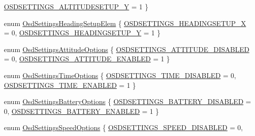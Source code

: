 \begin{DoxyCompactItemize}
\hyperlink{group___osd_settings_gga18264390d2835507563456b24f1dcb60a592bcfde58f9c3cf02070e2d4d96c140}{\-O\-S\-D\-S\-E\-T\-T\-I\-N\-G\-S\-\_\-\-A\-L\-T\-I\-T\-U\-D\-E\-S\-E\-T\-U\-P\-\_\-\-Y} = 1
 \}
\item 
enum \hyperlink{group___osd_settings_ga18a158ec456312dd7aeb13fa9e99f380}{\-Osd\-Settings\-Heading\-Setup\-Elem} \{ \hyperlink{group___osd_settings_gga18a158ec456312dd7aeb13fa9e99f380a3e342c17a72e8f2f9ce5863602b6ba02}{\-O\-S\-D\-S\-E\-T\-T\-I\-N\-G\-S\-\_\-\-H\-E\-A\-D\-I\-N\-G\-S\-E\-T\-U\-P\-\_\-\-X} = 0, 
\hyperlink{group___osd_settings_gga18a158ec456312dd7aeb13fa9e99f380a8a14958b0b8a7a6ec356d9b7a7de1b49}{\-O\-S\-D\-S\-E\-T\-T\-I\-N\-G\-S\-\_\-\-H\-E\-A\-D\-I\-N\-G\-S\-E\-T\-U\-P\-\_\-\-Y} = 1
 \}
\item 
enum \hyperlink{group___osd_settings_gaacff9da7fadd73b3f77732789fc3b015}{\-Osd\-Settings\-Attitude\-Options} \{ \hyperlink{group___osd_settings_ggaacff9da7fadd73b3f77732789fc3b015a8c47c1d9752a75c1268c9d44c0284221}{\-O\-S\-D\-S\-E\-T\-T\-I\-N\-G\-S\-\_\-\-A\-T\-T\-I\-T\-U\-D\-E\-\_\-\-D\-I\-S\-A\-B\-L\-E\-D} = 0, 
\hyperlink{group___osd_settings_ggaacff9da7fadd73b3f77732789fc3b015a9d40e6702b19dc2f4a49c4ee9d3ef2be}{\-O\-S\-D\-S\-E\-T\-T\-I\-N\-G\-S\-\_\-\-A\-T\-T\-I\-T\-U\-D\-E\-\_\-\-E\-N\-A\-B\-L\-E\-D} = 1
 \}
\item 
enum \hyperlink{group___osd_settings_gafe2af3db28b01633d6435ea50b6f9092}{\-Osd\-Settings\-Time\-Options} \{ \hyperlink{group___osd_settings_ggafe2af3db28b01633d6435ea50b6f9092a4de2e3f162202a18d5aa5bf9bfb35314}{\-O\-S\-D\-S\-E\-T\-T\-I\-N\-G\-S\-\_\-\-T\-I\-M\-E\-\_\-\-D\-I\-S\-A\-B\-L\-E\-D} = 0, 
\hyperlink{group___osd_settings_ggafe2af3db28b01633d6435ea50b6f9092af7c374d8c3479a2ee8c8f305800275f3}{\-O\-S\-D\-S\-E\-T\-T\-I\-N\-G\-S\-\_\-\-T\-I\-M\-E\-\_\-\-E\-N\-A\-B\-L\-E\-D} = 1
 \}
\item 
enum \hyperlink{group___osd_settings_gaa88f3eee2171bf6e6ed1703403a607e4}{\-Osd\-Settings\-Battery\-Options} \{ \hyperlink{group___osd_settings_ggaa88f3eee2171bf6e6ed1703403a607e4a3a790b7754301f7b0faa16f5e7a9977d}{\-O\-S\-D\-S\-E\-T\-T\-I\-N\-G\-S\-\_\-\-B\-A\-T\-T\-E\-R\-Y\-\_\-\-D\-I\-S\-A\-B\-L\-E\-D} = 0, 
\hyperlink{group___osd_settings_ggaa88f3eee2171bf6e6ed1703403a607e4aebb4f68c07ccd6831016fe34f5854b86}{\-O\-S\-D\-S\-E\-T\-T\-I\-N\-G\-S\-\_\-\-B\-A\-T\-T\-E\-R\-Y\-\_\-\-E\-N\-A\-B\-L\-E\-D} = 1
 \}
\item 
enum \hyperlink{group___osd_settings_ga75920d493f2f5fe4953c2c1beb93c8f5}{\-Osd\-Settings\-Speed\-Options} \{ \hyperlink{group___osd_settings_gga75920d493f2f5fe4953c2c1beb93c8f5a55a8241afef5f079836febdadd4da3b7}{\-O\-S\-D\-S\-E\-T\-T\-I\-N\-G\-S\-\_\-\-S\-P\-E\-E\-D\-\_\-\-D\-I\-S\-A\-B\-L\-E\-D} = 0, 

\end{DoxyCompactItemize}
